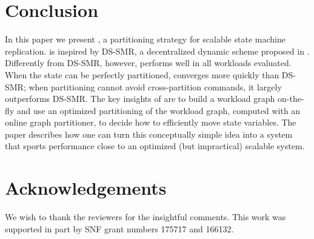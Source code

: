 \section{Conclusion}
\label{sec:conclusion}

In this paper we present \dynastar, a partitioning strategy for scalable state machine replication.
\dynastar is inspired by DS-SMR, a decentralized dynamic scheme proposed in \cite{hoang2016}.
Differently from DS-SMR, however, \dynastar performs well in all workloads evaluated.
When the state can be perfectly partitioned, \dynastar converges more quickly than DS-SMR; when partitioning cannot avoid cross-partition commands, it largely outperforms DS-SMR.
The key insights of \dynastar are to build a workload graph on-the-fly and use an optimized partitioning of the workload graph, computed with an online graph partitioner, to decide how to efficiently move state variables.
The paper describes how one can turn this conceptually simple idea into a system that sports performance close to an optimized (but impractical) scalable system.

\section*{Acknowledgements}

We wish to thank the reviewers for the insightful comments.
This work was supported in part by SNF grant numbers 175717 and 166132.